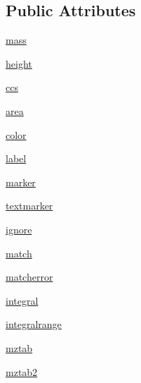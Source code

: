 \subsection*{Public Attributes}
\begin{DoxyCompactItemize}
\item 
\hyperlink{class_uni_dec_1_1unidec__modules_1_1peakstructure_1_1_peak_a80de30b2d6776413ad2368bed432f136}{mass}
\item 
\hyperlink{class_uni_dec_1_1unidec__modules_1_1peakstructure_1_1_peak_af1b26bf064a148d18e46dbda41ffdb9d}{height}
\item 
\hyperlink{class_uni_dec_1_1unidec__modules_1_1peakstructure_1_1_peak_a1bb43c7e03dec941074e254572867977}{ccs}
\item 
\hyperlink{class_uni_dec_1_1unidec__modules_1_1peakstructure_1_1_peak_a14c492a3132949a4aed22e001a3d4f49}{area}
\item 
\hyperlink{class_uni_dec_1_1unidec__modules_1_1peakstructure_1_1_peak_a58f2e7e6633bb71e6eae95d9aed6042c}{color}
\item 
\hyperlink{class_uni_dec_1_1unidec__modules_1_1peakstructure_1_1_peak_a791ae7ec99678bdff5542099c44d4090}{label}
\item 
\hyperlink{class_uni_dec_1_1unidec__modules_1_1peakstructure_1_1_peak_a0e4fb2e42acbfe8aa6dd46cfa770afa7}{marker}
\item 
\hyperlink{class_uni_dec_1_1unidec__modules_1_1peakstructure_1_1_peak_a67063685fc09f6ac8329d967b72211d1}{textmarker}
\item 
\hyperlink{class_uni_dec_1_1unidec__modules_1_1peakstructure_1_1_peak_a177e257a8494709fef82ace6b876eb51}{ignore}
\item 
\hyperlink{class_uni_dec_1_1unidec__modules_1_1peakstructure_1_1_peak_ae9450e61ff7b1f2cd4e3cd24b6fe97ba}{match}
\item 
\hyperlink{class_uni_dec_1_1unidec__modules_1_1peakstructure_1_1_peak_ab8c015acf35fc43c98c2cfcffb3e5544}{matcherror}
\item 
\hyperlink{class_uni_dec_1_1unidec__modules_1_1peakstructure_1_1_peak_aa02d7b9fe5f277ca1ed88bc8c03cc2db}{integral}
\item 
\hyperlink{class_uni_dec_1_1unidec__modules_1_1peakstructure_1_1_peak_a3a43306e32dc5cafeea934ffa61754ba}{integralrange}
\item 
\hyperlink{class_uni_dec_1_1unidec__modules_1_1peakstructure_1_1_peak_a660dc709d36d2f86210066107187118a}{mztab}
\item 
\hyperlink{class_uni_dec_1_1unidec__modules_1_1peakstructure_1_1_peak_a559ecf3427297effa482903080507cc6}{mztab2}

\end{DoxyCompactItemize}
